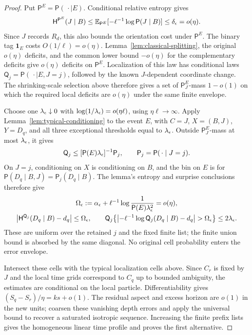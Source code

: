 \begin{proof}
Put $\mathsf P^E=\mathsf P(\,\cdot\mid E)$.  Conditional relative
entropy gives
\[
 \mathsf H^{\mathsf P^E}(J\mid B)
 \le\mathbb E_{\mathsf P^E}[-\ell^{-1}\log\mathsf P(J\mid B)]
 \le\delta_\epsilon=o(\eta).
\]
Since $J$ records $R_d$, this also bounds the orientation cost under
$\mathsf P^E$.  The binary tag $\boldsymbol1_E$ costs
$O(1/\ell)=o(\eta)$.  Lemma~\ref{lem:classical-splitting}, the original
$o(\eta)$ deficits, and the common lower bound $-o(\eta)$ for the
complementary deficits give $o(\eta)$ deficits on $\mathsf P^E$.
Localization of this law has conditional laws
$\mathsf Q_j=\mathsf P(\,\cdot\mid E,J=j)$, followed by the known
$J$-dependent coordinate change.  The shrinking-scale selection above
therefore gives a set of $\mathsf P^E_J$-mass $1-o(1)$ on which the
required local deficits are $o(\eta)$ under the same finite envelope.

Choose one $\lambda_\epsilon\downarrow0$ with
$\log(1/\lambda_\epsilon)=o(\eta\ell)$, using $\eta\ell\to\infty$.
Apply Lemma~\ref{lem:typical-conditioning} to the event $E$, with
$C=J$, $X=(B,J)$, $Y=D_q$, and all three exceptional thresholds
equal to $\lambda_\epsilon$.
Outside $\mathsf P^E_J$-mass at most $\lambda_\epsilon$, it gives
\[
 \mathsf Q_j\le[\mathsf P(E)\lambda_\epsilon]^{-1}\mathsf P_j,
 \qquad \mathsf P_j=\mathsf P(\,\cdot\mid J=j).
\]
On $J=j$, conditioning on $X$ is conditioning on $B$, and the bin
on $E$ is for $\mathsf P(D_q\mid B,J)=\mathsf P_j(D_q\mid B)$.
The lemma's entropy and surprise conclusions therefore give
\[
 \begin{gathered}
 \Omega_\epsilon:=
 \alpha_\epsilon+\ell^{-1}\log\frac1{\mathsf P(E)\lambda_\epsilon^2}
       =o(\eta),\\
 \left|\mathsf H^{\mathsf Q_j}(D_q\mid B)-d_q\right|\le\Omega_\epsilon,\qquad
 \mathsf Q_j\!\left\{
 \left|-\ell^{-1}\log\mathsf Q_j(D_q\mid B)-d_q\right|
       >\Omega_\epsilon\right\}\le2\lambda_\epsilon .
 \end{gathered}
\]
These are uniform over the retained $j$ and the fixed finite list;
the finite union bound is absorbed by the same diagonal.  No original
cell probability enters the error envelope.

Intersect these cells with the typical localization cells above.
Since $C_r$ is fixed by $J$ and the local time grids correspond to
$C_q$ up to bounded ambiguity, the estimates are conditional on the
local particle.  Differentiability gives $(S_q-S_r)/\eta=ks+o(1)$.
The residual aspect and excess horizon are $o(1)$ in the new units;
coarsen these vanishing depth errors and apply the universal bound to
recover a saturated isotropic sequence.  Increasing the finite prefix
lists gives the homogeneous linear time profile and proves the first
alternative.


\end{proof}
